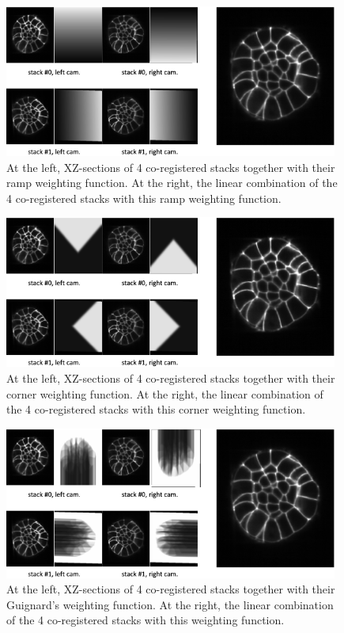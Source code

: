 \begin{figure}
\begin{center}
\includegraphics[height=50mm]{figures/fusion-ramp-combination.png}
\end{center}
\caption{\label{fig:cli:fuse:ramp:combination} At the left, XZ-sections of 4 co-registered stacks together with their ramp weighting function.
At the right, the linear combination of the 4 co-registered stacks with this ramp weighting function.}
\end{figure}

\begin{figure}
\begin{center}
\includegraphics[height=50mm]{figures/fusion-corner-combination.png}
\end{center}
\caption{\label{fig:cli:fuse:corner:combination} At the left, XZ-sections of 4 co-registered stacks together with their corner weighting function.
At the right, the linear combination of the 4 co-registered stacks with this corner weighting function.}
\end{figure}

\begin{figure}
\begin{center}
\includegraphics[height=50mm]{figures/fusion-guignard-combination.png}
\end{center}
\caption{\label{fig:cli:fuse:guignard:combination} At the left, XZ-sections of 4 co-registered stacks together with their Guignard's weighting function.
At the right, the linear combination of the 4 co-registered stacks with this weighting function.}
\end{figure}




